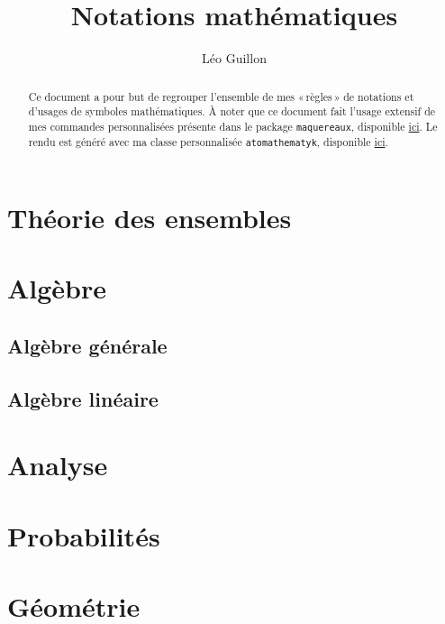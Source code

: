 \documentclass[print]{atomathematyk}
\title{Notations mathématiques}
\author{Léo Guillon}
\date{}
\begin{document}
\maketitle

\begin{abstract}
  Ce document a pour but de regrouper l’ensemble de mes «\,règles\,» de notations et d’usages de symboles mathématiques. À noter que ce document fait l’usage extensif de mes commandes personnalisées présente dans le package \texttt{maquereaux}, disponible \href{https://github.com/LeoGuillon/maquereaux}{ici}. Le rendu est généré avec ma classe personnalisée \texttt{atomathematyk}, disponible \href{https://github.com/LeoGuillon/atomathematyk}{ici}.
\end{abstract}

\tableofcontents

\section{Théorie des ensembles}\label{sec:set-theory}

\section{Algèbre}\label{sec:algebra}

\subsection{Algèbre générale}\label{sec:}

\subsection{Algèbre linéaire}\label{sec:}

\section{Analyse}\label{sec:analyse}

\section{Probabilités}\label{sec:probas}

\section{Géométrie}\label{sec:geometry}
\end{document}

